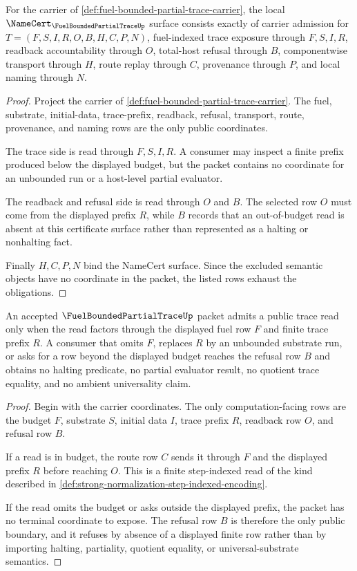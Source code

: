 \begin{theorem}
\label{thm:fuel-bounded-partial-trace-namecert-obligations}
For the carrier of \autoref{def:fuel-bounded-partial-trace-carrier}, the local $\NameCert_{\FuelBoundedPartialTraceUp}$ surface consists exactly of carrier admission for $T=(F,S,I,R,O,B,H,C,P,N)$, fuel-indexed trace exposure through $F,S,I,R$, readback accountability through $O$, total-host refusal through $B$, componentwise transport through $H$, route replay through $C$, provenance through $P$, and local naming through $N$.
\end{theorem}
\begin{proof}
Project the carrier of \autoref{def:fuel-bounded-partial-trace-carrier}. The fuel, substrate, initial-data, trace-prefix, readback, refusal, transport, route, provenance, and naming rows are the only public coordinates.

The trace side is read through $F,S,I,R$. A consumer may inspect a finite prefix produced below the displayed budget, but the packet contains no coordinate for an unbounded run or a host-level partial evaluator.

The readback and refusal side is read through $O$ and $B$. The selected row $O$ must come from the displayed prefix $R$, while $B$ records that an out-of-budget read is absent at this certificate surface rather than represented as a halting or nonhalting fact.

Finally $H,C,P,N$ bind the NameCert surface. Since the excluded semantic objects have no coordinate in the packet, the listed rows exhaust the obligations.
\end{proof}

\begin{theorem}
\label{thm:fuel-bounded-partial-trace-total-host-refusal}
An accepted $\FuelBoundedPartialTraceUp$ packet admits a public trace read only when the read factors through the displayed fuel row $F$ and finite trace prefix $R$. A consumer that omits $F$, replaces $R$ by an unbounded substrate run, or asks for a row beyond the displayed budget reaches the refusal row $B$ and obtains no halting predicate, no partial evaluator result, no quotient trace equality, and no ambient universality claim.
\end{theorem}
\begin{proof}
Begin with the carrier coordinates. The only computation-facing rows are the budget $F$, substrate $S$, initial data $I$, trace prefix $R$, readback row $O$, and refusal row $B$.

If a read is in budget, the route row $C$ sends it through $F$ and the displayed prefix $R$ before reaching $O$. This is a finite step-indexed read of the kind described in \autoref{def:strong-normalization-step-indexed-encoding}.

If the read omits the budget or asks outside the displayed prefix, the packet has no terminal coordinate to expose. The refusal row $B$ is therefore the only public boundary, and it refuses by absence of a displayed finite row rather than by importing halting, partiality, quotient equality, or universal-substrate semantics.
\end{proof}

